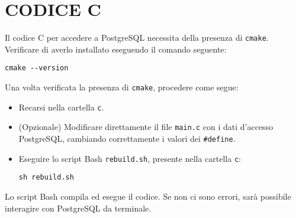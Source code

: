 \documentclass[a4paper, 10pt]{article}
\begin{document}
\section{CODICE C}
Il codice C per accedere a PostgreSQL necessita della presenza di \texttt{cmake}. Verificare di averlo installato eseguendo il comando seguente:

\begin{verbatim}
cmake --version
\end{verbatim}
Una volta verificata la presenza di \texttt{cmake}, procedere come segue:
\begin{itemize}
    \item Recarsi nella cartella \texttt{c}.
    \item (Opzionale) Modificare direttamente il file \texttt{main.c} con i dati d'accesso PostgreSQL, cambiando correttamente i valori dei \texttt{\#define}.
    \item Eseguire lo script Bash \texttt{rebuild.sh}, presente nella cartella \texttt{c}: 
\begin{verbatim}
sh rebuild.sh
\end{verbatim}
\end{itemize}
Lo script Bash compila ed esegue il codice. Se non ci sono errori, sarà possibile interagire con PostgreSQL da terminale.
\end{document}

